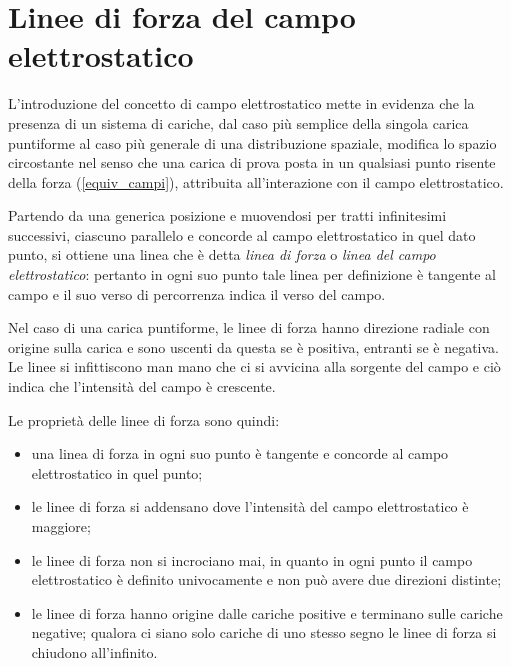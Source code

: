 \documentclass[class=book, crop=false, oneside, 12pt]{standalone}
\begin{document}
\section{Linee di forza del campo elettrostatico}
L'introduzione del concetto di campo elettrostatico mette in evidenza che la presenza di un sistema di cariche, dal caso più semplice della singola carica puntiforme al caso più generale di una distribuzione spaziale, modifica lo spazio circostante nel senso che una carica di prova posta in un qualsiasi punto risente della forza (\ref{equiv_campi}), attribuita all'interazione con il campo elettrostatico.

Partendo da una generica posizione e muovendosi per tratti infinitesimi successivi, ciascuno parallelo e concorde al campo elettrostatico in quel dato punto, si ottiene una linea che è detta \emph{linea di forza} o \emph{linea del campo elettrostatico}: 
pertanto in ogni suo punto tale linea per definizione è tangente al campo e il suo verso di percorrenza indica il verso del campo.

Nel caso di una carica puntiforme, le linee di forza hanno direzione radiale con origine sulla carica e sono uscenti da questa se è positiva, entranti se è negativa. 
Le linee si infittiscono man mano che ci si avvicina alla sorgente del campo e ciò indica che l'intensità del campo è crescente. 

Le proprietà delle linee di forza sono quindi:
\begin{itemize}
    \item una linea di forza in ogni suo punto è tangente e concorde al campo elettrostatico in quel punto;
    \item le linee di forza si addensano dove l'intensità del campo elettrostatico è maggiore; 
    \item le linee di forza non si incrociano mai, in quanto in ogni punto il campo elettrostatico è definito univocamente e non può avere due direzioni distinte;
    \item le linee di forza hanno origine dalle cariche positive e terminano sulle cariche negative; qualora ci siano solo cariche di uno stesso segno le linee di forza si chiudono all'infinito.
\end{itemize}
\end{document}
